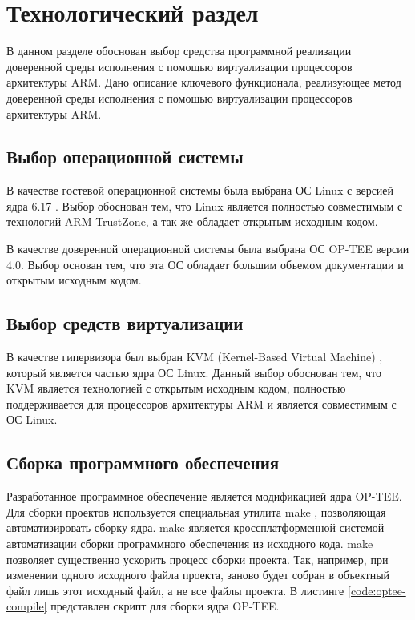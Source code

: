 \section{Технологический раздел}

В данном разделе обоснован выбор средства программной реализации доверенной среды исполнения с помощью виртуализации процессоров архитектуры ARM. Дано описание ключевого функционала, реализующее метод доверенной среды исполнения с помощью виртуализации процессоров архитектуры ARM.

\subsection{Выбор операционной системы}

В качестве гостевой операционной системы была выбрана ОС Linux с версией ядра 6.17 \cite{linux}. Выбор обоснован тем, что Linux является полностью совместимым с технологий ARM TrustZone, а так же обладает открытым исходным кодом.

В качестве доверенной операционной системы была выбрана ОС OP-TEE версии 4.0. Выбор основан тем, что эта ОС обладает большим объемом документации и открытым исходным кодом.

\subsection{Выбор средств виртуализации}

В качестве гипервизора был выбран KVM (Kernel-Based Virtual Machine) \cite{kvm}, который является частью ядра ОС Linux. Данный выбор обоснован тем, что KVM является технологией с открытым исходным кодом, полностью поддерживается для процессоров архитектуры ARM и является совместимым с ОС Linux.

\subsection{Сборка программного обеспечения}

Разработанное программное обеспечение является модификацией ядра OP-TEE. Для сборки проектов используется специальная утилита make \cite{make}, позволяющая автоматизировать сборку ядра. make является кроссплатформенной системой автоматизации сборки программного обеспечения из исходного кода. make позволяет существенно ускорить процесс сборки проекта. Так, например, при изменении одного исходного файла проекта, заново будет собран в объектный файл лишь этот исходный файл, а не все файлы проекта. В листинге \ref{code:optee-compile} представлен скрипт для сборки ядра OP-TEE.

